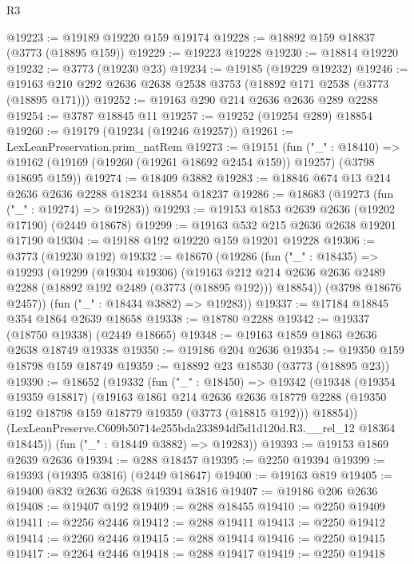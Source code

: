 \begin{lexlean}{R3}
\begin{coremodule}
@19223 := @19189 @19220 @159 @19174
@19228 := @18892 @159 @18837 (@3773 (@18895 @159))
@19229 := @19223 @19228
@19230 := @18814 @19220
@19232 := @3773 (@19230 @23)
@19234 := @19185 (@19229 @19232)
@19246 := @19163 @210 @292 @2636 @2638 @2538 @3753 (@18892 @171 @2538 (@3773 (@18895 @171)))
@19252 := @19163 @290 @214 @2636 @2636 @289 @2288
@19254 := @3787 @18845 @11
@19257 := @19252 (@19254 @289) @18854
@19260 := @19179 (@19234 (@19246 @19257))
@19261 := LexLeanPreservation.prim_natRem
@19273 := @19151
    (fun ("_" : @18410) =>
    @19162 (@19169 (@19260 (@19261 @18692 @2454 @159)) @19257) (@3798 @18695 @159))
@19274 := @18409 @3882
@19283 := @18846 @674 @13 @214 @2636 @2636 @2288 @18234 @18854 @18237
@19286 := @18683 (@19273 (fun ("_" : @19274) => @19283))
@19293 := @19153 @1853 @2639 @2636 (@19202 @17190) (@2449 @18678)
@19299 := @19163 @532 @215 @2636 @2638 @19201 @17190
@19304 := @19188 @192 @19220 @159 @19201 @19228
@19306 := @3773 (@19230 @192)
@19332 := @18670
    (@19286
      (fun ("_" : @18435) =>
      @19293
        (@19299
          (@19304 @19306)
          (@19163
            @212
            @214
            @2636
            @2636
            @2489
            @2288
            (@18892 @192 @2489 (@3773 (@18895 @192)))
            @18854))
        (@3798 @18676 @2457))
      (fun ("_" : @18434 @3882) => @19283))
@19337 := @17184 @18845 @354 @1864 @2639 @18658
@19338 := @18780 @2288
@19342 := @19337 (@18750 @19338) (@2449 @18665)
@19348 := @19163 @1859 @1863 @2636 @2638 @18749 @19338
@19350 := @19186 @204 @2636
@19354 := @19350 @159 @18798 @159 @18749
@19359 := @18892 @23 @18530 (@3773 (@18895 @23))
@19390 := @18652
    (@19332
      (fun ("_" : @18450) =>
      @19342
        (@19348
          (@19354 @19359 @18817)
          (@19163
            @1861
            @214
            @2636
            @2636
            @18779
            @2288
            (@19350 @192 @18798 @159 @18779 @19359 (@3773 (@18815 @192)))
            @18854))
        (LexLeanPreserve.C609b50714e255bda233894df5d1d120d.R3.__rel_12 @18364 @18445))
      (fun ("_" : @18449 @3882) => @19283))
@19393 := @19153 @1869 @2639 @2636
@19394 := @288 @18457
@19395 := @2250 @19394
@19399 := @19393 (@19395 @3816) (@2449 @18647)
@19400 := @19163 @819
@19405 := @19400 @832 @2636 @2638 @19394 @3816
@19407 := @19186 @206 @2636
@19408 := @19407 @192
@19409 := @288 @18455
@19410 := @2250 @19409
@19411 := @2256 @2446
@19412 := @288 @19411
@19413 := @2250 @19412
@19414 := @2260 @2446
@19415 := @288 @19414
@19416 := @2250 @19415
@19417 := @2264 @2446
@19418 := @288 @19417
@19419 := @2250 @19418

\end{coremodule}
\end{lexlean}
